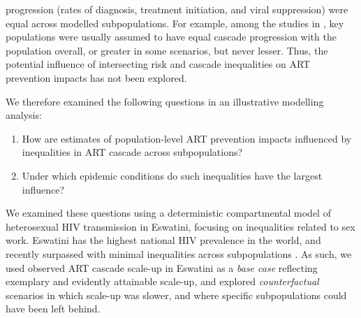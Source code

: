 progression (\ie rates of diagnosis, treatment initiation, and viral suppression)
were equal across modelled subpopulations.
For example, among the studies in \cite{Knight2022sr},
key populations were usually assumed to have
equal cascade progression with the population overall,
or greater in some scenarios, but never lesser.
Thus, the potential influence of intersecting risk and cascade inequalities
on ART prevention impacts has not been explored.
\par
We therefore examined the following questions in an illustrative modelling analysis:
\begin{enumerate}
  \item\label{obj:art.1} How are estimates of population-level ART prevention impacts
    influenced by inequalities in ART cascade across subpopulations?
  \item\label{obj:art.2} Under which epidemic conditions
    do such inequalities have the largest influence?
\end{enumerate}
We examined these questions using
a deterministic compartmental model of heterosexual HIV transmission in Eswatini,
focusing on inequalities related to sex work.
Eswatini has the highest national HIV prevalence in the world,
and recently surpassed \cashi with minimal inequalities across subpopulations
\cite{SHIMS3,UNAIDS2023}.
As such, we used observed ART cascade scale-up in Eswatini as a \emph{base case}
reflecting exemplary and evidently attainable scale-up,
and explored \emph{counterfactual} scenarios in which scale-up was slower,
and where specific subpopulations could have been left behind.

